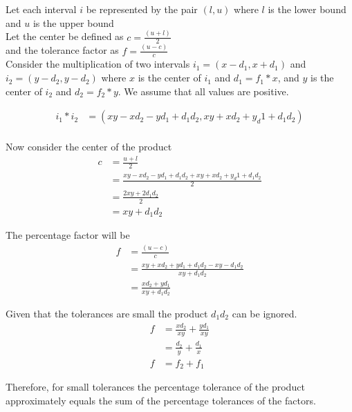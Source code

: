 \documentclass[a4paper,12pt]{article}
\begin{document}
Let each interval $i$ be represented by the pair $(l, u)$ where $l$ is the lower bound and $u$ is the upper bound\\

Let the center be defined as $c = \frac{(u+l)}{2}$ \\ and the tolerance factor as $f = \frac{(u-c)}{c}$ \\

Consider the multiplication of two intervals $i_1=(x-d_1, x + d_1)$ and $i_2=(y-d_2, y-d_2)$ where $x$ is the center of $i_1$ and $d_1 = f_1 * x$, and $y$ is the center of $i_2$ and $d_2 = f_2 * y$. We assume that all values are positive.

\begin{align}
i_1*i_2 &= (xy - xd_2 - yd_1 + d_1d_2, xy + xd_2 + y_d1 + d_1d_2) \\
\end{align}

Now consider the center of the product
\begin{align}
c &= \frac{u+l}{2} \\
  & = \frac{xy - xd_2 - yd_1 + d_1d_2 + xy + xd_2 + y_d1 + d_1d_2}{2} \\ 
  & = \frac{2xy + 2d_1d_2}{2} \\
  & = xy + d_1d_2
\end{align}

The percentage factor will be
\begin{align}
f &= \frac{(u-c)}{c} \\
  & = \frac{xy + xd_2 + yd_1 + d_1d_2 - xy -d_1d_2}{xy + d_1d_2} \\
  & = \frac{xd_2 + yd_1}{xy + d_1d_2}
\end{align}

Given that the tolerances are small the product $d_1d_2$ can be ignored.
\begin{align}
f &= \frac{xd_2}{xy} + \frac{yd_1}{xy} \\
  & = \frac{d_2}{y} + \frac{d_1}{x} \\
f & = f_2 + f_1
\end{align}

Therefore, for small tolerances the percentage tolerance of the product approximately equals the sum of the percentage tolerances of the factors.
\end{document}

